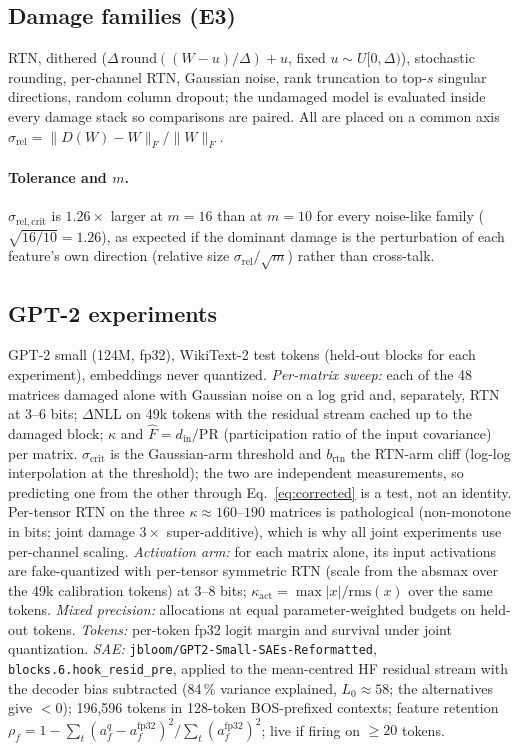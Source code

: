 \documentclass{article}
\begin{document}
\subsection{Damage families (E3)}
RTN, dithered ($\Delta\,\mathrm{round}((W-u)/\Delta)+u$, fixed $u\sim U[0,\Delta)$),
stochastic rounding, per-channel RTN, Gaussian noise, rank truncation to top-$s$ singular directions, random column dropout;
the undamaged model is evaluated inside every damage stack so comparisons are paired. All are placed on a common axis
$\sigma_{\mathrm{rel}} = \lVert D(W)-W\rVert_F/\lVert W\rVert_F$.

\paragraph{Tolerance and $m$.} $\sigma_{\mathrm{rel,crit}}$ is $1.26\times$ larger at $m=16$ than at $m=10$ for every
noise-like family ($\sqrt{16/10}=1.26$), as expected if the dominant damage is the perturbation of each feature's own
direction (relative size $\sigma_{\mathrm{rel}}/\sqrt m$) rather than cross-talk.

\subsection{GPT-2 experiments}
\label{sec:lm-methods}
GPT-2 small (124M, fp32), WikiText-2 test tokens (held-out blocks for each experiment), embeddings never quantized.
\emph{Per-matrix sweep:} each of the 48 matrices damaged alone with Gaussian noise on a log grid and, separately, RTN at
3--6 bits; $\Delta$NLL on 49k tokens with the residual stream cached up to the damaged block; $\kappa$ and
$\hat F=d_{\mathrm{in}}/\mathrm{PR}$ (participation ratio of the input covariance) per matrix. $\sigma_{\mathrm{crit}}$ is the
Gaussian-arm threshold and $b_{\mathrm{rtn}}$ the RTN-arm cliff (log-log interpolation at the threshold); the two are
independent measurements, so predicting one from the other through Eq.~\eqref{eq:corrected} is a test, not an identity.
Per-tensor RTN on the three $\kappa\approx160$--$190$ matrices
is pathological (non-monotone in bits; joint damage $3\times$ super-additive), which is why all joint experiments use
per-channel scaling. \emph{Activation arm:} for each matrix alone, its input activations are fake-quantized with per-tensor symmetric
RTN (scale from the absmax over the 49k calibration tokens) at 3--8 bits; $\kappa_{\mathrm{act}} = \max|x|/\mathrm{rms}(x)$
over the same tokens. \emph{Mixed precision:} allocations at equal parameter-weighted budgets on held-out tokens.
\emph{Tokens:} per-token fp32 logit margin and survival under joint quantization.
\emph{SAE:} \texttt{jbloom/GPT2-Small-SAEs-Reformatted}, \texttt{blocks.6.hook\_resid\_pre}, applied to the
mean-centred HF residual stream with the decoder bias subtracted (84\,\% variance explained, $L_0\approx58$; the
alternatives give $<0$); 196{,}596 tokens in 128-token BOS-prefixed contexts; feature retention
$\rho_f = 1-\sum_t(a_f^q-a_f^{\mathrm{fp32}})^2/\sum_t(a_f^{\mathrm{fp32}})^2$; live if firing on $\ge20$ tokens.
\end{document}
